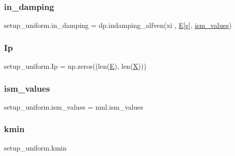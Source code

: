 \mbox{\label{namespacesetup__uniform_a61670f1e4db542f37be0aecf2966d034}} 
\subsubsection{\texorpdfstring{in\+\_\+damping}{in\_damping}}
{\footnotesize\ttfamily setup\+\_\+uniform.\+in\+\_\+damping = dp.\+indamping\+\_\+alfven(xi , \hyperlink{namespacesetup__uniform_a05accd2e8ab1c28d2f58f024c9a64fac}{E}\mbox{[}\hyperlink{constants_8h_a2b076531cd50c7b55702a53221f2ac72}{e}\mbox{]}, \hyperlink{namespacesetup__uniform_a34870362e4309cb440bb19768f5e5337}{ism\+\_\+values})}

\mbox{\label{namespacesetup__uniform_aca2b4d5151a48a6c27e19c6720c71dc5}} 
\subsubsection{\texorpdfstring{Ip}{Ip}}
{\footnotesize\ttfamily setup\+\_\+uniform.\+Ip = np.\+zeros((len(\hyperlink{namespacesetup__uniform_a05accd2e8ab1c28d2f58f024c9a64fac}{E}), len(\hyperlink{namespacesetup__uniform_a6d0e53624e475055c31146a2ff8d762c}{X})))}

\mbox{\label{namespacesetup__uniform_a34870362e4309cb440bb19768f5e5337}} 
\subsubsection{\texorpdfstring{ism\+\_\+values}{ism\_values}}
{\footnotesize\ttfamily setup\+\_\+uniform.\+ism\+\_\+values = nml.\+ism\+\_\+values}

\mbox{\label{namespacesetup__uniform_aa9389432000f10350c77da1d4e176553}} 
\subsubsection{\texorpdfstring{kmin}{kmin}}
{\footnotesize\ttfamily setup\+\_\+uniform.\+kmin}

